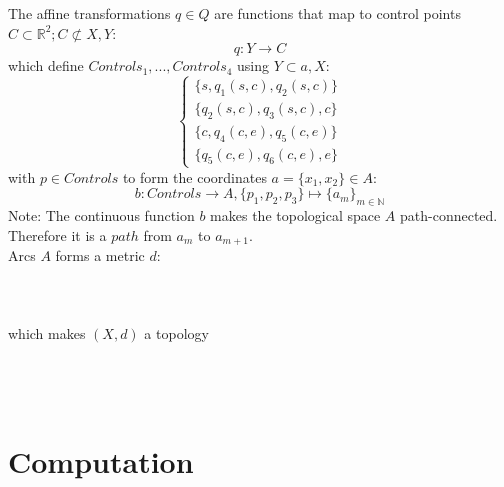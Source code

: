 \documentclass{article}
\begin{document}
The affine transformations $q \in Q$ are functions that map to control points $C \subset \mathbb{R}^2; C \not\subset X,Y$:
\begin{equation}
q: Y \rightarrow C
\end{equation}
which define $Controls_{1}, ... , Controls_{4}$ using $Y \subset a, X$:
\begin{equation}
\begin{cases}
\{s,q_{1}(s,c),q_{2}(s,c)\}\\
\{q_{2}(s,c),q_{3}(s,c),c\}\\
\{c,q_{4}(c,e),q_{5}(c,e)\}\\
\{q_{5}(c,e),q_{6}(c,e),e\}
\end{cases}
\end{equation}
with $p \in Controls$ to form the coordinates $a=\{x_{1},x_{2}\} \in A$:
\begin{equation}
b: Controls \rightarrow A, \{p_{1},p_{2},p_{3}\} \mapsto \{a_{m}\}_{m \in \mathbb{N}}
\end{equation}
Note: The continuous function $b$ makes the topological space $A$ path-connected. Therefore it is a $path$ from $a_{m}$ to $a_{m+1}$. ~\cite{Mortad}~\cite{path}\\
Arcs $A$ forms a metric $d$:\\\\\\\\
which makes $(X,d)$ a topology\\\\\\\\

\section{Computation}

\iffalse
\begin{equation} 
\forall u,v \in V :
d(u,v) = 
\begin{cases}
0,  u=v \\
1,  u \neq v 
\end{cases}
\end{equation}
\fi

\printbibliography
\end{document}
